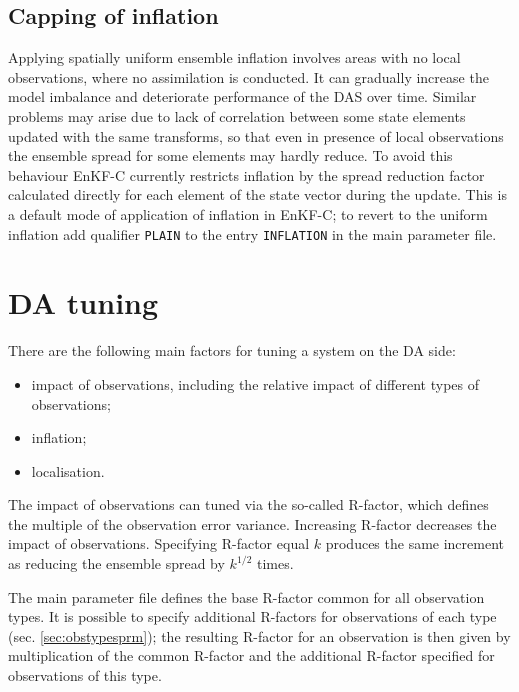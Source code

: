 \documentclass[11pt]{report}
\begin{document}
\subsection{Capping of inflation}

Applying spatially uniform ensemble inflation involves areas with no local observations, where no assimilation is conducted.
It can gradually increase the model imbalance and deteriorate performance of the DAS over time.
Similar problems may arise due to lack of correlation between some state elements updated with the same transforms, so that even in presence of local observations the ensemble spread for some elements may hardly reduce.
To avoid this behaviour EnKF-C currently restricts inflation by the spread reduction factor calculated directly for each element of the state vector during the update.
This is a default mode of application of inflation in EnKF-C; to revert to the uniform inflation add qualifier \verb|PLAIN| to the entry \verb|INFLATION| in the main parameter file.

\section{DA tuning}
\label{sec:datuning}

There are the following main factors for tuning a system on the DA side:
\begin{itemize}
\item impact of observations, including the relative impact of different types of observations;
\item inflation;
\item localisation.
\end{itemize}

The impact of observations can tuned via the so-called R-factor, which defines the multiple of the observation error variance.
Increasing R-factor decreases the impact of observations.
Specifying R-factor equal $k$ produces the same increment as reducing the ensemble spread by $k^{1/2}$ times.

The main parameter file defines the base R-factor common for all observation types.
It is possible to specify additional R-factors for observations of each type (sec. \ref{sec:obstypesprm}); the resulting R-factor for an observation is then given by multiplication of the common R-factor and the additional R-factor specified for observations of this type.
\end{document}
